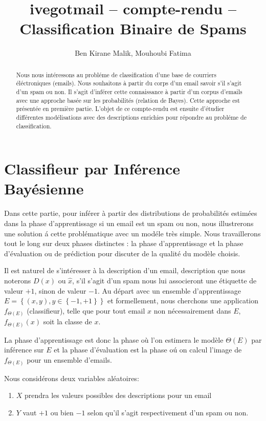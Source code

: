 \documentclass[a4paper, french]{article}
\title{ivegotmail -- compte-rendu --\\ Classification Binaire de Spams}
\author{Ben Kirane Malik, Mouhoubi Fatima}
\begin{document}
\maketitle
\setlength{\parskip}{0.1in}
\setlength{\parindent}{15pt}

\begin{abstract}
Nous nous int\'eressons au probl\'eme de classification d'une base de courriers \'el\'ectroniques (emails). Nous souhaitons \`a partir du corps d'un email savoir s'il s'agit d'un spam ou non. Il s'agit d'inf\'erer cette connaissance \`a partir d'un corpus d'emails avec une approche bas\'ee sur les probabilit\'es (relation de Bayes). Cette approche est  pr\'esent\'ee en premi\`ere partie. L'objet de ce compte-rendu est ensuite d'\'etudier diff\'erentes mod\'elisations avec des descriptions enrichies pour r\'epondre au probl\'eme de classification.
\end{abstract}

\section{Classifieur par Inf\'erence Bay\'esienne}
Dans cette partie, pour inf\'erer \`a partir des distributions de probabilit\'es estim\'ees dans la phase d'apprentissage si un email est un spam ou non, nous illustrerons une solution \'a cette probl\'ematique  avec un mod\'ele tr\`es simple.  
Nous travaillerons tout le long sur deux phases distinctes : la phase d'apprentissage et la phase d'\'evaluation ou de pr\'ediction pour discuter de la qualit\'e du mod\`ele choisis.

Il est naturel de s'int\'eresser \`a la description d'un email, description que nous noterons $D(x)$ ou $\hat{x}$, s'il s'agit d'un spam nous lui associeront une \'etiquette de valeur $+1$, sinon de valeur $-1$. 
Au d\'epart avec un ensemble d'apprentissage $E=\left\{(x,y), y\in \left\{-1,+1\right\}\right\}$ et formellement, nous cherchons une application $f_{\Theta(E)}$  (classifieur), telle que pour tout email $x$ non n\'ecessairement dans $E$, $f_{\Theta(E)}(x)$ soit la classe de $x$. 

La phase d'apprentissage est donc la phase o\`u l'on estimera le mod\`ele  $\Theta(E)$ par inf\'erence sur $E$ et la phase d'\'evaluation est la phase o\'u on calcul l'image de $f_{\Theta(E)}$ pour un ensemble d'emails.

Nous consid\'erons deux variables al\'eatoires:
\begin{enumerate}
\item $X$ prendra les valeurs possibles des descriptions pour un email
\item $Y$ vaut $+1$ ou bien $-1$ selon qu'il s'agit respectivement d'un spam ou non.
\end{enumerate}
\end{document}
